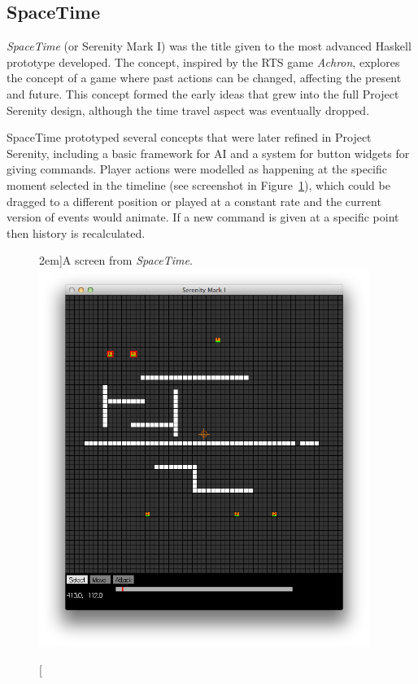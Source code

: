 \subsection{SpaceTime}

\emph{SpaceTime} (or Serenity Mark I) was the title given to the most advanced Haskell prototype developed. The concept, inspired by the RTS game \emph{Achron}, explores the concept of a game where past actions can be changed, affecting the present and future. This concept formed the early ideas that grew into the full Project Serenity design, although the time travel aspect was eventually dropped.

SpaceTime prototyped several concepts that were later refined in Project Serenity, including a basic framework for AI and a system for button widgets for giving commands. Player actions were modelled as happening at the specific moment selected in the timeline (see screenshot in Figure~\ref{fig:spacetimescreen}), which could be dragged to a different position or played at a constant rate and the current version of events would animate. If a new command is given at a specific point then history is recalculated.

\begin{figure}
	\caption[A screen from \emph{SpaceTime}][2em]{A screen from \emph{SpaceTime}.}
	\includegraphics[width=29em]{res/spacetime/spacetimescreen.png}
	\label{fig:spacetimescreen}
\end{figure}

